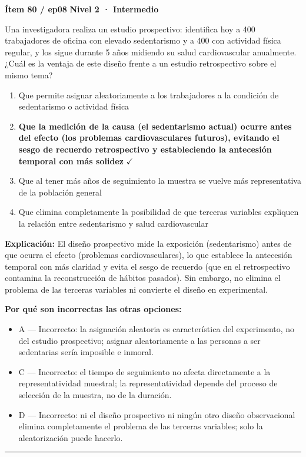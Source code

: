 \documentclass[12pt,a4paper]{article}
\begin{document}
\begin{mdframed}[backgroundcolor=fondogris,linecolor=ambar,linewidth=1pt,innerleftmargin=10pt,innerrightmargin=10pt,innertopmargin=7pt,innerbottommargin=7pt]
\textbf{Ítem 80 / ep08} \hfill {\small\bfseries\color{ambar} Nivel 2 · Intermedio}
\end{mdframed}

Una investigadora realiza un estudio prospectivo: identifica hoy a 400 trabajadores de oficina con elevado sedentarismo y a 400 con actividad física regular, y los sigue durante 5 años midiendo su salud cardiovascular anualmente. ¿Cuál es la ventaja de este diseño frente a un estudio retrospectivo sobre el mismo tema?

\begin{enumerate}
  \item[A.] Que permite asignar aleatoriamente a los trabajadores a la condición de sedentarismo o actividad física
  \item[\textbf{\color{verde}B.}] \textbf{\color{verde} Que la medición de la causa (el sedentarismo actual) ocurre antes del efecto (los problemas cardiovasculares futuros), evitando el sesgo de recuerdo retrospectivo y estableciendo la antecesión temporal con más solidez} \hfill $\checkmark$
  \item[C.] Que al tener más años de seguimiento la muestra se vuelve más representativa de la población general
  \item[D.] Que elimina completamente la posibilidad de que terceras variables expliquen la relación entre sedentarismo y salud cardiovascular
\end{enumerate}

\noindent\textbf{\color{azul}Explicación:} El diseño prospectivo mide la exposición (sedentarismo) antes de que ocurra el efecto (problemas cardiovasculares), lo que establece la antecesión temporal con más claridad y evita el sesgo de recuerdo (que en el retrospectivo contamina la reconstrucción de hábitos pasados). Sin embargo, no elimina el problema de las terceras variables ni convierte el diseño en experimental.

\noindent\textbf{\color{gris}Por qué son incorrectas las otras opciones:}
\begin{itemize}
  \item {\small A — Incorrecto: la asignación aleatoria es característica del experimento, no del estudio prospectivo; asignar aleatoriamente a las personas a ser sedentarias sería imposible e inmoral.}
  \item {\small C — Incorrecto: el tiempo de seguimiento no afecta directamente a la representatividad muestral; la representatividad depende del proceso de selección de la muestra, no de la duración.}
  \item {\small D — Incorrecto: ni el diseño prospectivo ni ningún otro diseño observacional elimina completamente el problema de las terceras variables; solo la aleatorización puede hacerlo.}
\end{itemize}
\vspace{8pt}\hrule\vspace{10pt}
\end{document}
